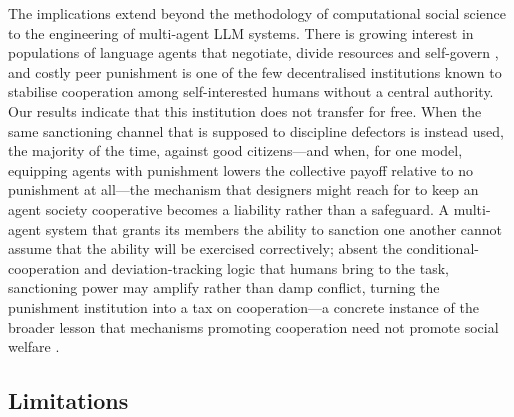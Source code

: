 \documentclass[openacc]{rsproca_new}
\begin{document}
The implications extend beyond the methodology of computational social science to the engineering of multi-agent LLM systems. There is growing interest in populations of language agents that negotiate, divide resources and self-govern \parencite{park2023generative,vezhnevets2023generative,akata2023playing,leng2023llm,hammond2025multiagent,piatti2024cooperate,gupta2025norm}, and costly peer punishment is one of the few decentralised institutions known to stabilise cooperation among self-interested humans without a central authority. Our results indicate that this institution does not transfer for free. When the same sanctioning channel that is supposed to discipline defectors is instead used, the majority of the time, against good citizens---and when, for one model, equipping agents with punishment lowers the collective payoff relative to no punishment at all---the mechanism that designers might reach for to keep an agent society cooperative becomes a liability rather than a safeguard. A multi-agent system that grants its members the ability to sanction one another cannot assume that the ability will be exercised correctively; absent the conditional-cooperation and deviation-tracking logic that humans bring to the task, sanctioning power may amplify rather than damp conflict, turning the punishment institution into a tax on cooperation---a concrete instance of the broader lesson that mechanisms promoting cooperation need not promote social welfare \cite{han2024welfare}.

\subsection{Limitations}
\end{document}
